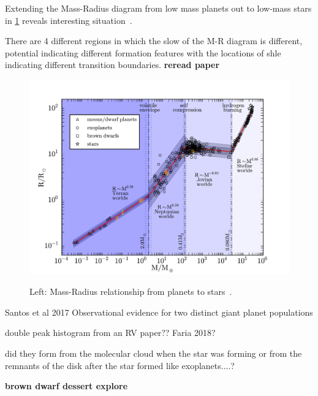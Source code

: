 Extending the Mass-Radius diagram from low mass planets out to low-mass stars in \cref{fig:mass_radius_relation} reveals interesting situation~\citet{chen_probabilistic_2016}.

There are 4 different regions in which the slow of the M-R diagram is different, potential indicating different formation features with the locations of shle indicating different transition boundaries. \textbf{reread paper} 

\begin{figure}[t]
    \centering
    \includegraphics[width=0.9\linewidth]{./figures/introduction/mass_radius_relation.pdf}  \\
    \caption{Left: Mass-Radius relationship from planets to stars~\citet{chen_probabilistic_2016}.}
    \label{fig:mass_radius_relation}
\end{figure}


\citep{santos_observational_2017} Santos et al 2017   Observational evidence for two distinct giant planet populations





double peak histogram from an {RV} paper?? Faria 2018?


did they form from the molecular cloud when the star was forming or from the remnants of the disk after the star formed like exoplanets....?






\textbf{brown dwarf dessert explore \citet{ranc_moa2007blg197_2015}}


